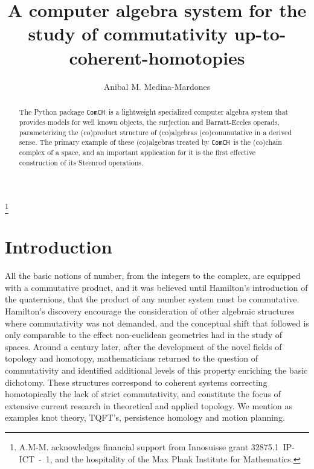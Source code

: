 \documentclass{amsart}
\newcommand{\comch}{\texttt{ComCH}}
\begin{document}
\title[A C.A.S. for the study of commutativity up-to-coherent-homotopies]{A computer algebra system for the study of commutativity up-to-coherent-homotopies}
\author{Anibal M. Medina-Mardones}
\address{Max Plank Institute for Mathematics, Bonn, Germany}
\address{Department of Mathematics, University of Notre Dame, Notre Dame, IN, USA}
\thanks{A.M-M. acknowledges financial support from Innosuisse grant \mbox{32875.1 IP-ICT - 1}, and the hospitality of the Max Plank Institute for Mathematics.}

\begin{abstract}
	The Python package \comch\, is a lightweight specialized computer algebra system that provides models for well known objects, the surjection and Barratt-Eccles operads, parameterizing the (co)product structure of (co)algebras (co)commutative in a derived sense. The primary example of these (co)algebras treated by \comch\, is the (co)chain complex of a space, and an important application for it is the first effective construction of its Steenrod operations.
\end{abstract} 

\maketitle

\section{Introduction}

All the basic notions of number, from the integers to the complex, are equipped with a commutative product, and it was believed until Hamilton's introduction of the quaternions, that the product of any number system must be commutative. Hamilton's discovery encourage the consideration of other algebraic structures where commutativity was not demanded, and the conceptual shift that followed is only comparable to the effect non-euclidean geometries had in the study of spaces. Around a century later, after the development of the novel fields of topology and homotopy, mathematicians returned to the question of commutativity and identified additional levels of this property enriching the basic dichotomy. These structures correspond to coherent systems correcting homotopically the lack of strict commutativity, and constitute the focus of extensive current research in theoretical and applied topology. We mention as examples knot theory, TQFT's, persistence homology and motion planning.
\end{document}
